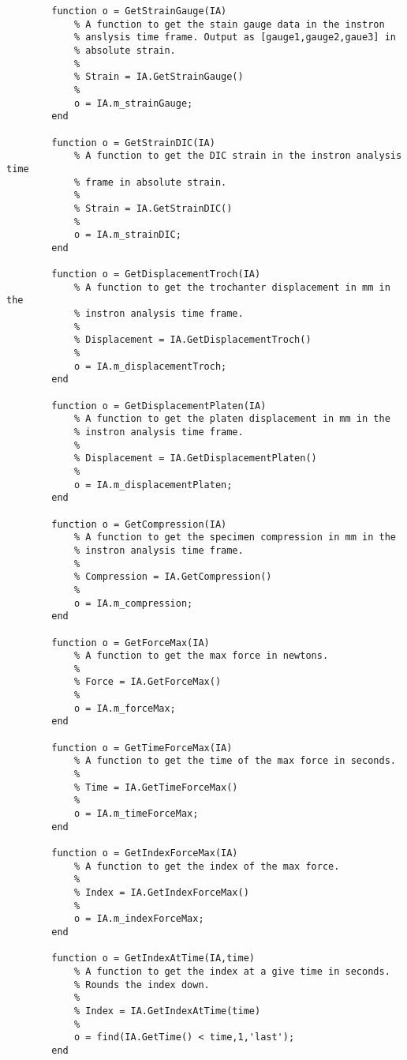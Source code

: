 \begin{lstlisting}
        function o = GetStrainGauge(IA)
            % A function to get the stain gauge data in the instron 
            % anslysis time frame. Output as [gauge1,gauge2,gaue3] in
            % absolute strain.
            %
            % Strain = IA.GetStrainGauge()
            %
            o = IA.m_strainGauge;
        end
        
        function o = GetStrainDIC(IA)
            % A function to get the DIC strain in the instron analysis time
            % frame in absolute strain.
            %
            % Strain = IA.GetStrainDIC()
            %
            o = IA.m_strainDIC;
        end
        
        function o = GetDisplacementTroch(IA)
            % A function to get the trochanter displacement in mm in the
            % instron analysis time frame.
            %
            % Displacement = IA.GetDisplacementTroch()
            %
            o = IA.m_displacementTroch;
        end
        
        function o = GetDisplacementPlaten(IA)
            % A function to get the platen displacement in mm in the
            % instron analysis time frame.
            %
            % Displacement = IA.GetDisplacementPlaten()
            %            
            o = IA.m_displacementPlaten;
        end
        
        function o = GetCompression(IA)
            % A function to get the specimen compression in mm in the
            % instron analysis time frame.
            %
            % Compression = IA.GetCompression()
            %
            o = IA.m_compression;
        end

        function o = GetForceMax(IA)
            % A function to get the max force in newtons.
            %
            % Force = IA.GetForceMax()
            %
            o = IA.m_forceMax;
        end

        function o = GetTimeForceMax(IA)
            % A function to get the time of the max force in seconds.
            %
            % Time = IA.GetTimeForceMax()
            %
            o = IA.m_timeForceMax;
        end

        function o = GetIndexForceMax(IA)
            % A function to get the index of the max force.
            %
            % Index = IA.GetIndexForceMax()
            %
            o = IA.m_indexForceMax;
        end

        function o = GetIndexAtTime(IA,time)
            % A function to get the index at a give time in seconds.
            % Rounds the index down.
            %
            % Index = IA.GetIndexAtTime(time)
            %
            o = find(IA.GetTime() < time,1,'last');
        end


\end{lstlisting}
